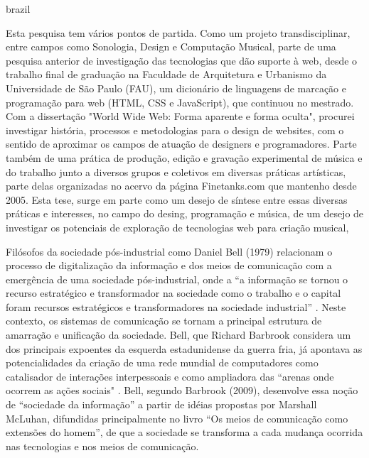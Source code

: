 \begin{otherlanguage*}{brazil}

    Esta pesquisa tem vários pontos de partida. Como um projeto transdisciplinar, entre campos como Sonologia, Design e Computação Musical, parte de uma pesquisa anterior de investigação das tecnologias que dão suporte à web, desde o trabalho final de graduação na Faculdade de Arquitetura e Urbanismo da Universidade de São Paulo (FAU), um dicionário de linguagens de marcação e programação para web (HTML, CSS e JavaScript), que continuou no mestrado. Com a dissertação "World Wide Web: Forma aparente e forma oculta", procurei investigar história, processos e metodologias para o design de websites, com o sentido de aproximar os campos de atuação de designers e programadores. Parte também de uma prática de produção, edição e gravação experimental de música e do trabalho junto a diversos grupos e coletivos em diversas práticas artísticas, parte delas organizadas no acervo da página Finetanks.com que mantenho desde 2005.  
    Esta tese, surge em parte como um desejo de síntese entre essas diversas práticas e interesses, no campo do desing, programação e música, de um desejo de investigar os potenciais de exploração de tecnologias web para criação musical, 
    
    
    Filósofos da sociedade pós-industrial como Daniel Bell (1979) \cite{bell1979thinking} relacionam o processo de digitalização da informação e dos meios de comunicação com a emergência de uma sociedade pós-industrial, onde a ``a informação se tornou o recurso estratégico e transformador na sociedade como o trabalho e o capital foram recursos estratégicos e transformadores na sociedade industrial'' \cite[26]{bell1979thinking}. Neste contexto, os sistemas de comunicação se tornam a principal estrutura de amarração e unificação da sociedade. Bell, que Richard Barbrook \cite{barbrook1999cyber} considera um dos principais expoentes da esquerda estadunidense da guerra fria, já apontava as potencialidades da criação de uma rede mundial de computadores como catalisador de interações interpessoais e como ampliadora das ``arenas onde ocorrem as ações sociais" \cite[22]{bell1979thinking}. Bell, segundo Barbrook (2009), desenvolve essa noção de ``sociedade da informação'' a partir de idéias propostas por Marshall McLuhan, difundidas principalmente no livro ``Os meios de comunicação como extensões do homem''\cite{luhan1964marshall}, de que a sociedade se  transforma a cada mudança ocorrida nas tecnologias e nos meios de comunicação. 
    

\end{otherlanguage*}
